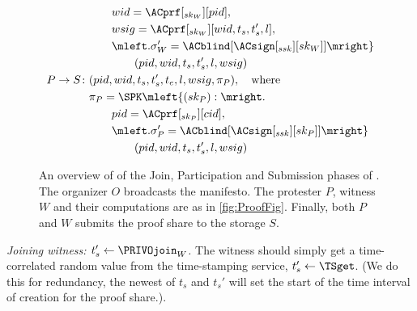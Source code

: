 \begin{figure}
\begin{minipage}{\linewidth}
\begin{align*}
        & \qquad wid = \ACprf[_{sk_W}][pid], \\
        & \qquad wsig = \ACprf[_{sk_W}][wid, t_s, t_s', l], \\
        & \qquad \mleft. \sigma_W' = \ACblind[\ACsign[_{ssk}][sk_W]]\mright\} \\
        & \qquad\qquad (pid, wid, t_s, t_s', l, wsig) \\
      P\to S\colon & (pid, wid, t_s, t_s', t_e, l, wsig, \pi_P),\quad 
      \text{where}\\
        & \pi_P = \SPK\mleft\{ (sk_P) : \mright. \\
        & \qquad pid = \ACprf[_{sk_P}][cid], \\
        & \qquad \mleft. \sigma_P' = \ACblind[\ACsign[_{ssk}][sk_P]] \mright\} 
        \\
        & \qquad\qquad (pid, wid, t_s, t_s', l, wsig)
    \end{align*}
  \end{minipage}
  \caption{%
    An overview of of the Join, Participation and Submission phases of \PRIVO.\@
    The organizer \(O\) broadcasts the manifesto.
    The protester \(P\), witness \(W\) and their computations are as in 
    \cref{fig:ProofFig}.
    Finally, both \(P\) and \(W\) submits the proof share to the storage \(S\).
  }%
  \label{fig:ProtocolOverview}
\end{figure}

\emph{Joining witness: \(t_s'\gets \PRIVOjoin_W\).}
The witness should simply get a time-correlated random value from the 
time-stamping service, \(t_s'\gets \TSget\).
(We do this for redundancy, the newest of \(t_s\) and \(t_s'\) will set the 
start of the time interval of creation for the proof share.).


